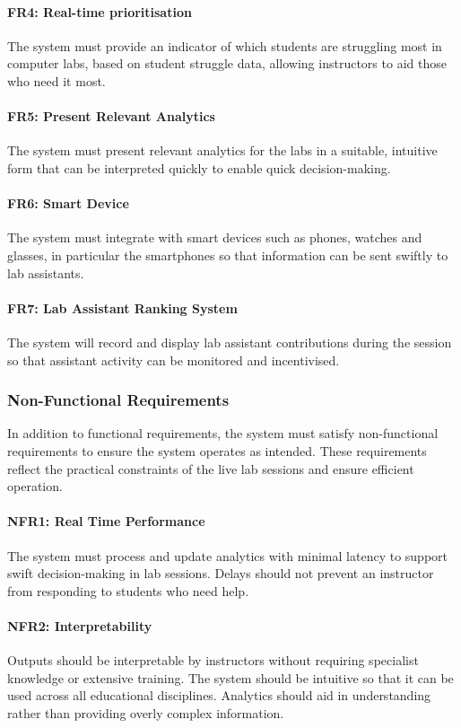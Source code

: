 \paragraph{FR4: Real-time prioritisation}
The system must provide an indicator of which students are struggling most in computer labs, based on student struggle data, allowing instructors to aid those who need it most.

\paragraph{FR5: Present Relevant Analytics}
The system must present relevant analytics for the labs in a suitable, intuitive form that can be interpreted quickly to enable quick decision-making.

\paragraph{FR6: Smart Device}
The system must integrate with smart devices such as phones, watches and glasses, in particular the smartphones so that information can be sent swiftly to lab assistants.

\paragraph{FR7: Lab Assistant Ranking System}
The system will record and display lab assistant contributions during the session so that assistant activity can be monitored and incentivised.

\subsubsection{Non-Functional Requirements}
In addition to functional requirements, the system must satisfy non-functional requirements to ensure the system operates as intended. These requirements reflect the practical constraints of the live lab sessions and ensure efficient operation.

\paragraph{NFR1: Real Time Performance }
The system must process and update analytics with minimal latency to support swift decision-making in lab sessions. Delays should not prevent an instructor from responding to students who need help.

\paragraph{NFR2: Interpretability}
Outputs should be interpretable by instructors without requiring specialist knowledge or extensive training. The system should be intuitive so that it can be used across all educational disciplines. Analytics should aid in understanding rather than providing overly complex information.

